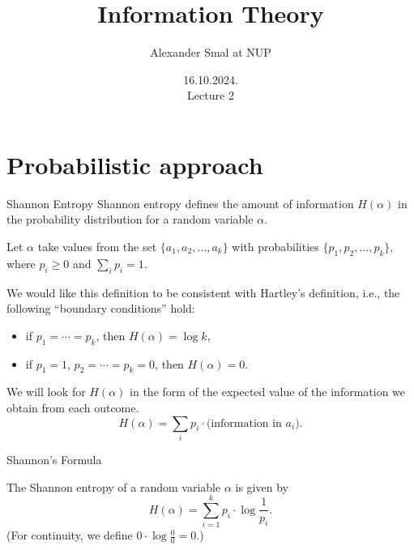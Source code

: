 \documentclass[handout,aspectratio=169]{beamer}
\title{Information Theory}
\author{Alexander Smal at NUP}
\date{16.10.2024.\\ Lecture 2}
\newcommand{\seqn}[2]{{#1}_1,{#1}_2,\dotsc,{#1}_{#2}}
\begin{document}
\begin{frame}[plain]
    \maketitle
\end{frame}

\section{Probabilistic approach}
\begin{frame}{Shannon Entropy}
Shannon entropy defines the amount of information \(H(\alpha)\) in the probability distribution for a random variable \(\alpha\).
\medskip\pause

Let \(\alpha\) take values from the set \(\{\seqn{a}{k}\}\) with probabilities \(\{\seqn{p}{k}\}\), where \(p_i \ge 0\) and \(\sum_i p_i = 1\).
\medskip\pause

We would like this definition to be consistent with Hartley's definition, i.e., the following ``boundary conditions'' hold:
\begin{itemize}
    \item if \(p_1 = \dotsb = p_k\), then \(H(\alpha) = \log k\),
    \item if \(p_1 = 1\), \(p_2 = \dotsb = p_k = 0\), then \(H(\alpha) = 0\).
\end{itemize}
\medskip\pause

We will look for \(H(\alpha)\) in the form of the expected value of the information we obtain from each outcome.
\[
H(\alpha) = \sum_i p_i \cdot \text{(information in $a_i$)}.
\]
\end{frame}

\begin{frame}{Shannon's Formula}
\begin{definition}[Shannon, 1948]
    The Shannon entropy of a random variable \(\alpha\) is given by
    \[
    H(\alpha) = \sum_{i=1}^k p_i \cdot \log \frac{1}{p_i}.
    \]
    (For continuity, we define \(0 \cdot \log \frac{0}{0} = 0\).)
    \end{definition}
    \medskip\pause

\end{frame}
\end{document}
